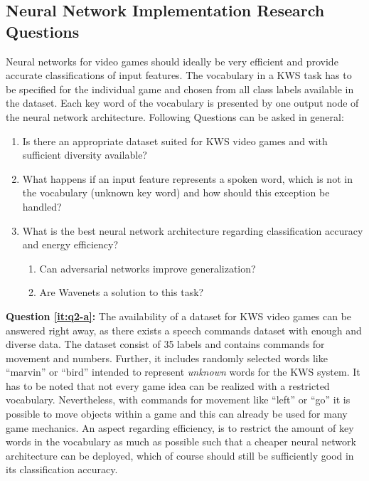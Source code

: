 \subsection{Neural Network Implementation Research Questions}\label{sec:intro_rq_nn}
Neural networks for video games should ideally be very efficient and provide accurate classifications of input features.
The vocabulary in a KWS task has to be specified for the individual game and chosen from all class labels available in the dataset.
Each key word of the vocabulary is presented by one output node of the neural network architecture.
Following Questions can be asked in general:
\begin{enumerate}[label={Q.2.\alph*)}, leftmargin=1.75cm]
  \item Is there an appropriate dataset suited for KWS video games and with sufficient diversity available?\label{it:q2-a}
  \item What happens if an input feature represents a spoken word, which is not in the vocabulary (unknown key word) and how should this exception be handled?\label{it:q2-b}
  \item What is the best neural network architecture regarding classification accuracy and energy efficiency?\label{it:q2-c}
  \begin{enumerate}[label=(\roman*)]
    \item Can adversarial networks improve generalization?
    \item Are Wavenets a solution to this task?
  \end{enumerate}
\end{enumerate}
\noindent
\textbf{Question \ref{it:q2-a}:} 
The availability of a dataset for KWS video games can be answered right away, as there exists a speech commands dataset \cite{Warden2018} with enough and diverse data.
The dataset consist of 35 labels and contains commands for movement and numbers.
Further, it includes randomly selected words like \enquote{marvin} or \enquote{bird} intended to represent \emph{unknown} words for the KWS system.
It has to be noted that not every game idea can be realized with a restricted vocabulary.
Nevertheless, with commands for movement like \enquote{left} or \enquote{go} it is possible to move objects within a game and this can already be used for many game mechanics.
An aspect regarding efficiency, is to restrict the amount of key words in the vocabulary as much as possible such that a cheaper neural network architecture can be deployed, which of course should still be sufficiently good in its classification accuracy.


